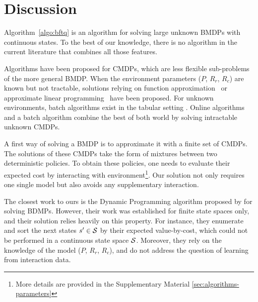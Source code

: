 \documentclass{article}
\begin{document}
\section{Discussion}

Algorithm~\ref{algo:bftq} is an algorithm for solving large unknown BMDPs with continuous states. To the best of our knowledge, there is no algorithm in the current literature that combines all those features.


Algorithms have been proposed for CMDPs, which are less flexible sub-problems of the more general BMDP. When the environment parameters ($P$, $R_r$, $R_c$) are known but not tractable, solutions relying on function approximation~\citep{Undurti} or approximate linear programming~\citep{Poupart2015} have been proposed. For unknown environments, batch algorithms exist in the tabular setting \citep{Thomas2015, Petrik2016, Laroche2019}. Online algorithms \citep{Geibel2005, Abe2010,ChowGJP15,AchiamHTA17} and a batch algorithm \citep{le2019batch} combine the best of both world by solving intractable unknown CMDPs.

A first way of solving a BMDP is to approximate it with a finite set of CMDPs. The solutions of these CMDPs take the form of mixtures between two deterministic policies\citep[Theorem 4.4,][]{BEUTLER1985236}. To obtain these policies, one needs to evaluate their expected cost by interacting with environment\footnote{More details are provided in the Supplementary Material \ref{sec:algorithms-parameters}}. Our solution not only requires one single model but also avoids any supplementary interaction.

The closest work to ours is the Dynamic Programming algorithm proposed by \citet{Boutilier_Lu:uai16} for solving BDMPs. However, their work was established for finite state spaces only, and their solution relies heavily on this property. For instance, they enumerate and sort the next states $s'\in\mathcal{S}$ by their expected value-by-cost, which could not be performed in a continuous state space $\mathcal{S}$. Moreover, they rely on the knowledge of the model ($P$, $R_r$, $R_c$), and do not address the question of learning from interaction data.
\end{document}

